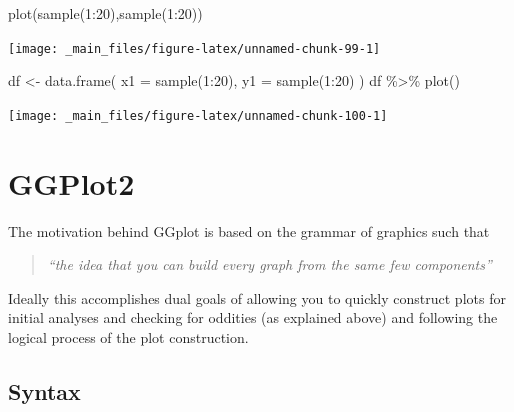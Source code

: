 \documentclass[
]{book}
\newenvironment{Shaded}{\begin{snugshade}}{\end{snugshade}}
\newcommand{\AttributeTok}[1]{\textcolor[rgb]{0.77,0.63,0.00}{#1}}
\newcommand{\DecValTok}[1]{\textcolor[rgb]{0.00,0.00,0.81}{#1}}
\newcommand{\FunctionTok}[1]{\textcolor[rgb]{0.00,0.00,0.00}{#1}}
\newcommand{\NormalTok}[1]{#1}
\newcommand{\OtherTok}[1]{\textcolor[rgb]{0.56,0.35,0.01}{#1}}
\newcommand{\SpecialCharTok}[1]{\textcolor[rgb]{0.00,0.00,0.00}{#1}}
\begin{document}
\begin{Shaded}
\begin{Highlighting}[]
\FunctionTok{plot}\NormalTok{(}\FunctionTok{sample}\NormalTok{(}\DecValTok{1}\SpecialCharTok{:}\DecValTok{20}\NormalTok{),}\FunctionTok{sample}\NormalTok{(}\DecValTok{1}\SpecialCharTok{:}\DecValTok{20}\NormalTok{))}
\end{Highlighting}
\end{Shaded}

\begin{center}\texttt{[image: \_main\_files/figure-latex/unnamed-chunk-99-1]} \end{center}

\begin{Shaded}
\begin{Highlighting}[]
\NormalTok{df }\OtherTok{\textless{}{-}} \FunctionTok{data.frame}\NormalTok{( }\AttributeTok{x1 =} \FunctionTok{sample}\NormalTok{(}\DecValTok{1}\SpecialCharTok{:}\DecValTok{20}\NormalTok{), }\AttributeTok{y1 =} \FunctionTok{sample}\NormalTok{(}\DecValTok{1}\SpecialCharTok{:}\DecValTok{20}\NormalTok{) )}
\NormalTok{df }\SpecialCharTok{\%\textgreater{}\%} \FunctionTok{plot}\NormalTok{()}
\end{Highlighting}
\end{Shaded}

\begin{center}\texttt{[image: \_main\_files/figure-latex/unnamed-chunk-100-1]} \end{center}

\hypertarget{ggplot2-1}{%
\section{GGPlot2}\label{ggplot2-1}}

The motivation behind GGplot is based on the grammar of graphics such that

\begin{quote}
\emph{``the idea that you can build every graph from the same few components''}
\end{quote}

Ideally this accomplishes dual goals of allowing you to quickly construct plots for initial analyses and checking for oddities (as explained above) and following the logical process of the plot construction.

\hypertarget{syntax-1}{%
\subsection{Syntax}\label{syntax-1}}
\end{document}
